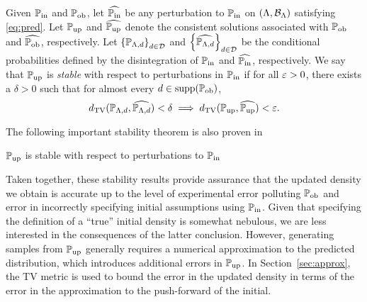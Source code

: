 \begin{defn}\label{defn:stableinitial}
  Given $\operatorname*{\mathbb{P}_{in}}$ and $\operatorname*{\mathbb{P}_{ob}}$, let $\widehat{\operatorname*{\mathbb{P}_{in}}}$ be any perturbation to $\operatorname*{\mathbb{P}_{in}}$ on $({\Lambda}, \mathcal{B}_{{\Lambda}})$ satisfying \eqref{eq:pred}.
  Let $\operatorname*{\mathbb{P}_{up}}$ and $\widehat{\operatorname*{\mathbb{P}_{up}}}$ denote the consistent solutions associated with $\operatorname*{\mathbb{P}_{ob}}$ and $\widehat{\operatorname*{\mathbb{P}_{ob}}}$, respectively.
  Let $\left\{\mathbb{P}_{{\Lambda}, d}\right\}_{d\in\mathcal{D}}^{}$ and $\left\{\widehat{\mathbb{P}_{{\Lambda}, d}}\right\}_{d\in\mathcal{D}}^{}$ be the conditional probabilities defined by the disintegration of $\operatorname*{\mathbb{P}_{in}}$ and $\widehat{\operatorname*{\mathbb{P}_{in}}}$, respectively.
  We say that $\operatorname*{\mathbb{P}_{up}}$ is \emph{stable} with respect to perturbations in $\operatorname*{\mathbb{P}_{in}}$ if for all $\varepsilon > 0$, there exists a $\delta > 0$ such that for almost every $d\in\text{supp}(\operatorname*{\mathbb{P}_{ob}})$,
  \begin{equation}\label{eq:stableinitial}
    d_{\text{TV}} (\mathbb{P}_{{\Lambda}, d}, \widehat{\mathbb{P}_{{\Lambda}, d}}) < \delta \implies d_{\text{TV}} (\operatorname*{\mathbb{P}_{up}}, \widehat{\operatorname*{\mathbb{P}_{up}}}) < \varepsilon.
  \end{equation}
\end{defn}

The following important stability theorem is also proven in \cite{BJW18}

\begin{thm}
  $\operatorname*{\mathbb{P}_{up}}$ is stable with respect to perturbations to $\operatorname*{\mathbb{P}_{in}}$
  \label{thm:stableinitial}
\end{thm}

Taken together, these stability results provide assurance that the updated density we obtain is accurate up to the level of experimental error polluting $\operatorname*{\mathbb{P}_{ob}}$ and error in incorrectly specifying initial assumptions using $\operatorname*{\mathbb{P}_{in}}$.
Given that specifying the definition of a ``true'' initial density is somewhat nebulous, we are less interested in the consequences of the latter conclusion.
However, generating samples from $\operatorname*{\mathbb{P}_{up}}$ generally requires a numerical approximation to the predicted distribution, which introduces additional errors in $\operatorname*{\mathbb{P}_{up}}$.
In Section~\ref{sec:approx}, the TV metric is used to bound the error in the updated density in terms of the error in the approximation to the push-forward of the initial.




